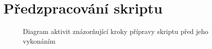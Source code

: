 
\chapter{Předzpracování skriptu}
\label{Annex.ScriptPreprocessing}

\begin{figure}[H]
  \begin{center}
    \caption{Diagram aktivit znázorňující kroky přípravy skriptu před jeho vykonáním}
    \label{Figure.ScriptPreparationSteps}
  \end{center}
\end{figure}


